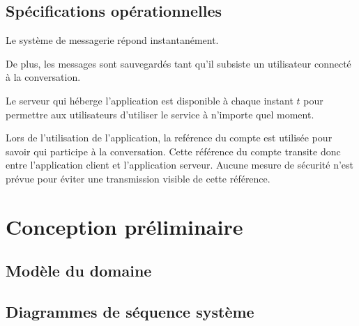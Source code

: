 \documentclass[11pt,dvipsnames,svgnames]{report}
\begin{document}
\section{Spécifications opérationnelles}

Le système de messagerie répond instantanément.

De plus, les messages sont sauvegardés tant qu'il subsiste un utilisateur connecté à la conversation.

Le serveur qui héberge l'application est disponible à chaque instant $t$ pour permettre aux utilisateurs d'utiliser le service à n'importe quel moment.

Lors de l'utilisation de l'application, la reférence du compte est utilisée pour savoir qui participe à la conversation. Cette référence du compte transite donc entre l'application client et l'application serveur. Aucune mesure de sécurité n'est prévue pour éviter une transmission visible de cette référence.

\chapter{Conception préliminaire}

\section{Modèle du domaine}


\section{Diagrammes de séquence système}



\end{document}
